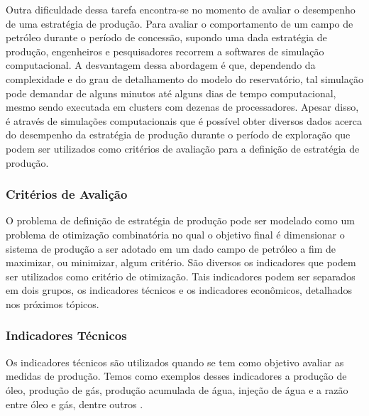 Outra dificuldade dessa tarefa encontra-se no momento de avaliar o desempenho de uma estratégia de produção. Para avaliar o comportamento de um campo de petróleo durante o período de concessão, supondo uma dada estratégia de produção, engenheiros e pesquisadores recorrem a softwares de simulação computacional. A desvantagem dessa abordagem é que, dependendo da complexidade e do grau de detalhamento do modelo do reservatório, tal simulação pode demandar de alguns minutos até alguns dias de tempo computacional, mesmo sendo executada em clusters com dezenas de processadores. Apesar disso, é através de simulações computacionais que é possível obter diversos dados acerca do desempenho da estratégia de produção durante o período de exploração que podem ser utilizados como critérios de avaliação para a definição de estratégia de produção. 

\subsubsection{Critérios de Avalição}

O problema de definição de estratégia de produção pode ser modelado como um problema de otimização combinatória no qual o objetivo final é dimensionar o sistema de produção a ser adotado em um dado campo de petróleo a fim de maximizar, ou minimizar, algum critério. São diversos os indicadores que podem ser utilizados como critério de otimização. Tais indicadores podem ser separados em dois grupos, os indicadores técnicos e os indicadores econômicos, detalhados nos próximos tópicos. 

\subsubsection{Indicadores Técnicos}

Os indicadores técnicos são utilizados quando se tem como objetivo avaliar as medidas de produção. Temos como exemplos desses indicadores a produção de óleo, produção de gás, produção acumulada de água, injeção de água e a razão entre óleo e gás, dentre outros \cite{Neves2004, Avansi2008}.

